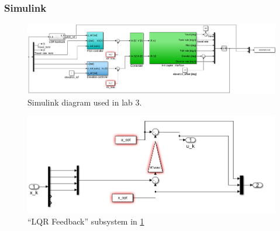 \documentclass[../main.tex]{subfiles}
\begin{document}
\subsubsection{Simulink}
\begin{figure}[h]
	\centering
	\includegraphics[width=1\linewidth, keepaspectratio]{code/lab3_simulink_1}
	\caption{Simulink diagram used in lab 3.}
	\label{fig:lab3_simulink}
\end{figure}
\begin{figure}[h]
	\centering
	\includegraphics[width=1\linewidth, keepaspectratio]{code/lab3_simulink_2}
	\caption{``LQR Feedback'' subsystem in \cref{fig:lab3_simulink}}
	\label{fig:lab3_simulink_lqr}
\end{figure}
\end{document}
